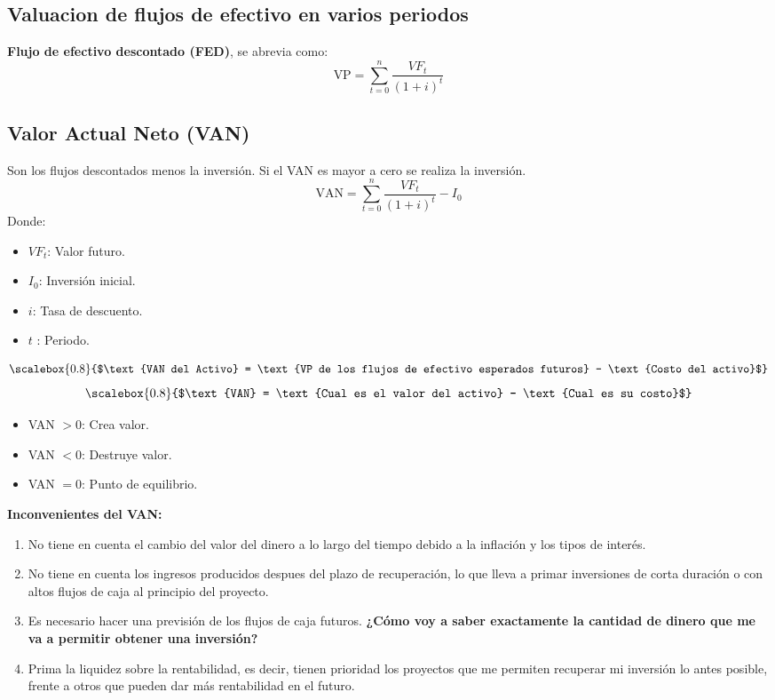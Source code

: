 \documentclass{templateNote}
\begin{document}
\subsection*{Valuacion de flujos de efectivo en varios periodos}
\textbf{Flujo de efectivo descontado (FED)}, se abrevia como:
\begin{equation*}
    \text{VP} = \sum_{t=0}^{n} \frac{{VF}_t}{(1 + i)^t}
\end{equation*}

\newpage
\subsection*{Valor Actual Neto (VAN)}
Son los flujos descontados menos la inversión.
Si el VAN es mayor a cero se realiza la inversión.
\begin{equation*}
    \text{VAN} = \sum_{t=0}^{n} \frac{{VF}_t}{(1 + i)^t} - I_0
\end{equation*}
Donde:
\begin{itemize}
    \item ${VF}_t$: Valor futuro.
    \item $I_0$: Inversión inicial.
    \item $i$: Tasa de descuento.
    \item $t$ : Periodo.
\end{itemize}
\begin{equation*}
    \scalebox{0.8}{$\text{VAN del Activo} = \text{VP de los flujos de efectivo esperados futuros} - \text{Costo del activo}$}
\end{equation*}
\begin{equation*}
    \scalebox{0.8}{$\text{VAN} = \text{Cual es el valor del activo} - \text{Cual es su costo}$}
\end{equation*}

\begin{itemize}
    \item VAN $ > 0$: Crea valor.
    \item VAN $ < 0$: Destruye valor.
    \item VAN $ = 0$: Punto de equilibrio.
\end{itemize}
\textbf{Inconvenientes del VAN:}
\begin{enumerate}
    \item No tiene en cuenta el cambio del valor del dinero a lo largo del tiempo debido a la inflación y los tipos de interés.
    \item No tiene en cuenta los ingresos producidos despues del plazo de recuperación, lo que lleva a primar inversiones de corta duración o con altos flujos de caja al principio del proyecto.
    \item Es necesario hacer una previsión de los flujos de caja futuros. \textbf{¿Cómo voy a saber exactamente la cantidad de dinero que me va a permitir obtener una inversión?}
    \item Prima la liquidez sobre la rentabilidad, es decir, tienen prioridad los proyectos que me permiten recuperar mi inversión lo antes posible, frente a otros que pueden dar más rentabilidad en el futuro.
\end{enumerate}
\end{document}
